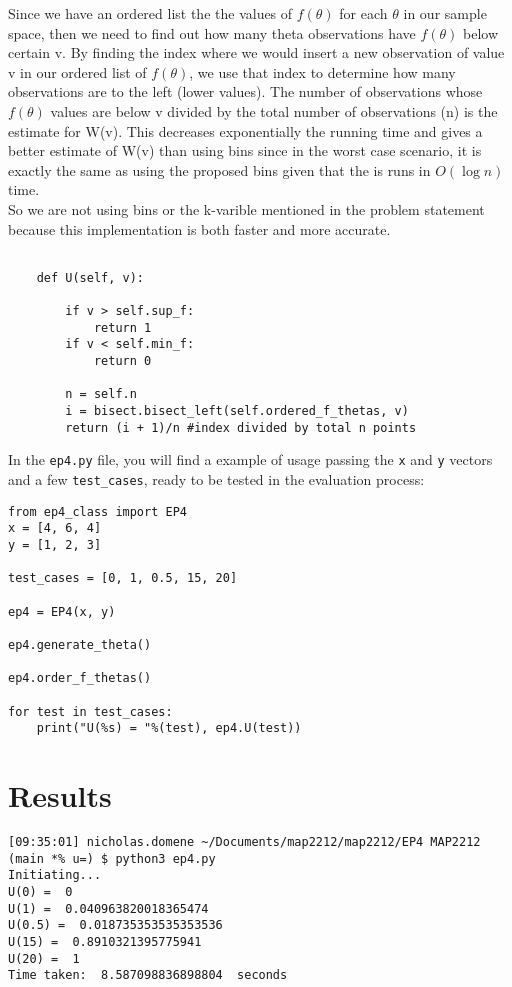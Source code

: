 \documentclass[12pt]{article}
\begin{document}
Since we have an ordered list the the values of $f(\theta)$ for each $\theta$ in our sample space, then we need to find out how many theta observations have $f(\theta)$ below certain v. By finding the index where we would insert a new observation of value v in our  ordered list of $f(\theta)$, we use that index to determine how many observations are to the left (lower values). The number of observations whose $f(\theta)$ values are below v divided by the  total number of observations (n) is the estimate for W(v). This decreases exponentially the running time and gives a better estimate of W(v) than using bins since in the worst case scenario, it is exactly the same as using the proposed bins given that the is runs in $O(\log n)$ time. \\
So we are not using bins or the k-varible mentioned in the problem statement because this implementation is both faster and more accurate.
\begin{lstlisting}

	def U(self, v):

		if v > self.sup_f:
			return 1
		if v < self.min_f:
			return 0

		n = self.n
		i = bisect.bisect_left(self.ordered_f_thetas, v)
		return (i + 1)/n #index divided by total n points
\end{lstlisting}
In the \texttt{ep4.py} file, you will find a example of usage passing the \texttt{x} and \texttt{y} vectors and a few \texttt{test\_cases}, ready to be tested in the evaluation process:
\begin{lstlisting}
from ep4_class import EP4
x = [4, 6, 4]
y = [1, 2, 3]

test_cases = [0, 1, 0.5, 15, 20]

ep4 = EP4(x, y)

ep4.generate_theta()

ep4.order_f_thetas()

for test in test_cases:
	print("U(%s) = "%(test), ep4.U(test))
\end{lstlisting}

\section*{Results}
\begin{lstlisting}
[09:35:01] nicholas.domene ~/Documents/map2212/map2212/EP4 MAP2212 (main *% u=) $ python3 ep4.py 
Initiating...
U(0) =  0
U(1) =  0.040963820018365474
U(0.5) =  0.018735353535353536
U(15) =  0.8910321395775941
U(20) =  1
Time taken:  8.587098836898804  seconds
\end{lstlisting}
\end{document}
